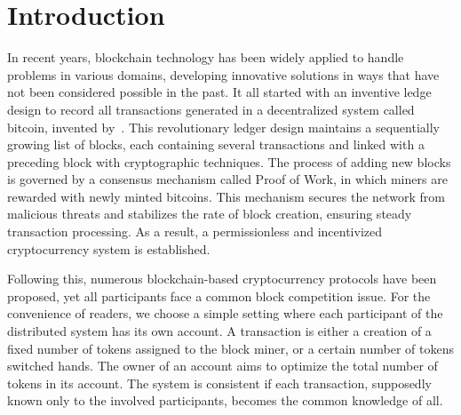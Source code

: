 \section{Introduction}

In recent years, blockchain technology has been widely applied to handle problems in various domains, developing innovative solutions in ways that have not been considered possible in the past.
It all started with an inventive ledge design to record all transactions generated in a decentralized system called bitcoin, invented by~\cite{nakamoto2008bitcoin}. 
This revolutionary ledger design maintains a sequentially growing list of blocks, each containing several transactions and linked with a preceding block with cryptographic techniques. 
The process of adding new blocks is governed by a consensus mechanism called Proof of Work, in which miners are rewarded with newly minted bitcoins.
This mechanism secures the network from malicious threats and stabilizes the rate of block creation, ensuring steady transaction processing. 
As a result, a permissionless and incentivized cryptocurrency system is established.


Following this, numerous blockchain-based cryptocurrency protocols have been proposed, yet all participants face a common block competition issue.
For the convenience of readers, we choose a simple setting where each participant of the distributed system has its own account.
A transaction is either a creation of a fixed number of tokens assigned to the block miner, or a certain number of tokens switched hands. 
The owner of an account aims to optimize the total number of tokens in its account. 
The system is consistent if each transaction, supposedly known only to the involved participants, becomes the common knowledge of all.  


